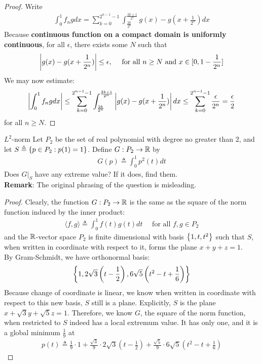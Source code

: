 \documentclass{report}
\begin{document}
\begin{proof}
Write
\begin{align*}
\int_0^1 f_ngdx= \sum_{k=0}^{2^{n-1}-1} \int_{\frac{2k}{2^n}}^{\frac{2k+1}{2^n}} g(x)- g(x+ \frac{1}{2^n}) dx 
\end{align*}
Because  \textbf{continuous function on a compact domain is uniformly continuous}, for all $\epsilon $, there exists some $N$ such that
\begin{align*}
\left|g(x)-g(x+ \frac{1}{2^n})\right| \leq \epsilon ,\quad \text{ for all }n\geq N\text{ and }x \in [0,1-\frac{1}{2^n}]
\end{align*}
We may now estimate: 
\begin{align*}
\left|\int_0^1f_ngdx\right|\leq \sum_{k=0}^{2^{n-1}-1} \int_{\frac{2k}{2^n}}^{\frac{2k+1}{2^n}} \left|g(x)-g(x+\frac{1}{2^n})\right| dx \leq \sum_{k=0}^{2^{n-1}-1} \frac{\epsilon }{2^n}= \frac{\epsilon }{2}
\end{align*}
for all $n\geq N$. 
\end{proof}
\begin{question}{$L^2$-norm}{}
Let $P_2$ be the set of real polynomial with degree no greater than  $2$, and let $S\triangleq \left\{ p \in P_2: p(1)=1 \right\}$. Define $G:P_2\rightarrow \mathbb{R}$ by 
\begin{align*}
G(p)\triangleq \int_0^1 p^2(t)dt
\end{align*}
Does $G|_S$ have any extreme value? If it does, find them.\\ 

\textbf{Remark}: The original phrasing of the question is misleading. 
\end{question}
\begin{proof}
Clearly, the function $G:P_2 \rightarrow \mathbb{R}$ is the same as the square of the norm function induced by the inner product: 
\begin{align*}
\langle f,g\rangle \triangleq \int_0^1 f(t)g(t)dt\quad \text{ for all }f,g \in P_2
\end{align*}
and the $\mathbb{R}$-vector space  $P_2$ is  finite dimensional with basis  $\left\{ 1,t,t^2 \right\}$ such that $S$, when written in coordinate with respect to it, forms the plane  $x+y+z=1$. \\

By Gram-Schmidt, we have orthonormal basis: 
\begin{align*}
\left\{  1, 2\sqrt{3}\left(t- \frac{1}{2} \right), 6 \sqrt{5} \left(t^2-t+ \frac{1}{6} \right)   \right\}
\end{align*}
Because change of coordinate is linear, we know when written in coordinate with  respect to this new basis, $S$ still is a plane. Explicitly, $S$ is the plane  $x + \sqrt{3}y+\sqrt{5}z=1$. Therefore, we know $G$, the square of the norm function, when restricted to $S$ indeed has a local extremum value. It has only one, and it is a global minimum $\frac{1}{9}$ at 
\begin{align*}
p(t)\triangleq \frac{1}{9}\cdot 1 + \frac{\sqrt{3}}{9} \cdot 2\sqrt{3}\left(t- \frac{1}{2} \right) + \frac{\sqrt{5} }{9} \cdot 6 \sqrt{5} \left(t^2-t+\frac{1}{6} \right) 
\end{align*}



\end{proof}
\end{document}
